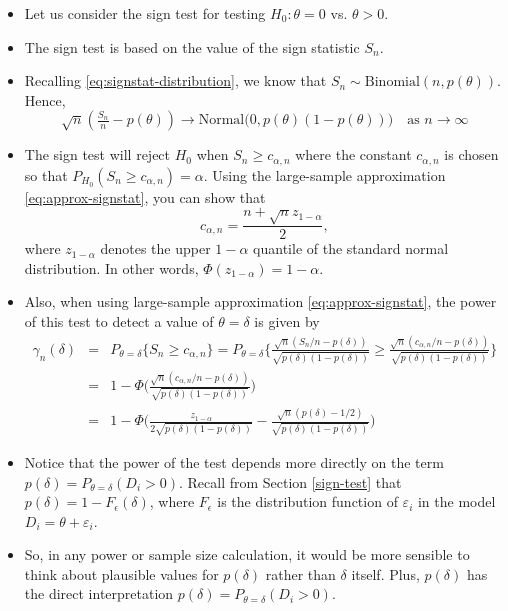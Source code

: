 \documentclass[]{book}
\begin{document}
\begin{itemize}
\item
  Let us consider the sign test for testing \(H_{0}: \theta = 0\) vs. \(\theta > 0\).
\item
  The sign test is based on the value of the sign statistic \(S_{n}\).
\item
  Recalling \eqref{eq:signstat-distribution}, we know that \(S_{n} \sim \textrm{Binomial}(n, p(\theta))\).
  Hence,
  \begin{equation}
  \sqrt{n}(\tfrac{S_{n}}{n} - p(\theta)) \longrightarrow \textrm{Normal}\Big( 0, p(\theta)(1 - p(\theta)) \Big) \quad \textrm{as } n \longrightarrow \infty
  \label{eq:approx-signstat}
  \end{equation}
\item
  The sign test will reject \(H_{0}\) when \(S_{n} \geq c_{\alpha,n}\) where the constant \(c_{\alpha,n}\) is chosen
  so that \(P_{H_{0}}( S_{n} \geq c_{\alpha,n} ) = \alpha\). Using the large-sample approximation \eqref{eq:approx-signstat}, you can
  show that
  \begin{equation}
  c_{\alpha, n} = \frac{n + \sqrt{n}z_{1-\alpha}}{2}, 
  \label{eq:critical-value-signstat}
  \end{equation}
  where \(z_{1-\alpha}\) denotes the upper \(1 - \alpha\) quantile of the standard normal distribution. In other words,
  \(\Phi( z_{1-\alpha}) = 1-\alpha\).
\item
  Also, when using large-sample approximation \eqref{eq:approx-signstat}, the power of this test to detect a value of \(\theta = \delta\) is given by
  \begin{eqnarray}
  \gamma_{n}(\delta) &=& P_{\theta=\delta}\{ S_{n} \geq c_{\alpha,n} \} 
  = P_{\theta=\delta}\Bigg\{ \frac{\sqrt{n}(S_{n}/n - p(\delta))}{\sqrt{ p(\delta)(1 - p(\delta)) } } \geq 
  \frac{ \sqrt{n}(c_{\alpha, n}/n - p(\delta)) }{ \sqrt{p(\delta)(1 - p(\delta))}  } \Bigg\}  \nonumber \\
  &=& 1 - \Phi\Bigg( \frac{ \sqrt{n}(c_{\alpha,n}/n - p(\delta)) }{ \sqrt{p(\delta)(1 - p(\delta))}  } \Bigg) \nonumber \\
  &=& 1 - \Phi\Bigg( \frac{ z_{1-\alpha} }{ 2\sqrt{p(\delta)(1 - p(\delta))}  } - \frac{ \sqrt{n}(p(\delta) - 1/2) }{ \sqrt{p(\delta)(1 - p(\delta))}  }\Bigg)
  \label{eq:powerfn-signstat}
  \end{eqnarray}
\item
  Notice that the power of the test depends more directly on the term \(p(\delta) = P_{\theta = \delta}(D_{i} > 0)\).
  Recall from Section \ref{sign-test} that
  \(p(\delta) = 1 - F_{\epsilon}(\delta)\), where \(F_{\epsilon}\) is the distribution function
  of \(\varepsilon_{i}\) in the model \(D_{i} = \theta + \varepsilon_{i}\).
\item
  So, in any power or sample size calculation, it would be more sensible to think about plausible
  values for \(p(\delta)\) rather than \(\delta\) itself. Plus, \(p(\delta)\) has the direct interpretation
  \(p(\delta) = P_{\theta=\delta}( D_{i} > 0)\).
\end{itemize}
\end{document}
